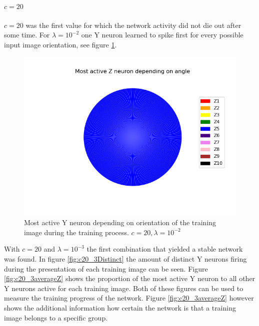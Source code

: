 \paragraph{$c = 20$}
$c = 20$ was the first value for which the network activity did not die out after some time. For $\lambda = 10^{-2}$ one Y neuron learned to spike first for every possible input image orientation, see figure \ref{fig:c20_2Pie}. 

\begin{figure}
  \includegraphics[width=\linewidth]{figures/angleNetwork/c20_2pie.png}
  \caption{Most active Y neuron depending on orientation of the training image during the training process. $c = 20, \lambda = 10^{-2}$}
  \label{fig:c20_2Pie}
\end{figure}

With $c = 20$ and $\lambda = 10^{-3}$ the first combination that yielded a stable network was found. In figure \ref{fig:c20_3Distinct} the amount of distinct Y neurons firing during the presentation of each training image can be seen. Figure \ref{fig:c20_3averageZ} shows the proportion of the most active Y neuron to all other Y neurons active for each training image. Both of these figures can be used to measure the training progress of the network. Figure \ref{fig:c20_3averageZ} however shows the additional information how certain the network is that a training image belongs to a specific group.

